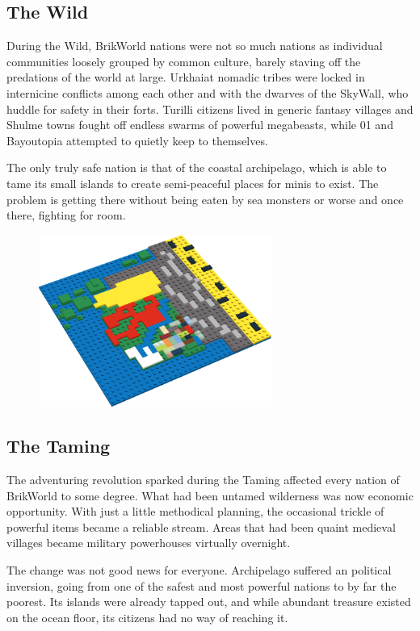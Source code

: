 \documentclass[12pt,a4paper,twocolumn]{article}
\begin{document}
\subsection {The Wild}

During the Wild, BrikWorld nations were not so much nations as individual communities loosely grouped by common culture, barely staving off the predations of the world at large.  Urkhaiat nomadic tribes were locked in internicine conflicts among each other and with the dwarves of the SkyWall, who huddle for safety in their forts.  Turilli citizens lived in generic fantasy villages and Shulme towns fought off endless swarms of powerful megabeasts, while 01 and Bayoutopia attempted to quietly keep to themselves.

The only truly safe nation is that of the coastal archipelago, which is able to tame its small islands to create semi-peaceful places for minis to exist.  The problem is getting there without being eaten by sea monsters or worse and once there, fighting for room.


\begin{figure}[h]
\includegraphics[width=3in]{TamingNations.png}
\end{figure}

\subsection{The Taming}

The adventuring revolution sparked during the Taming affected every nation of BrikWorld to some degree.  What had been untamed wilderness was now economic opportunity.  With just a little methodical planning, the occasional trickle of powerful items became a reliable stream.  Areas that had been quaint medieval villages became military powerhouses virtually overnight.

The change was not good news for everyone.  Archipelago suffered an political inversion, going from one of the safest and most powerful nations to by far the poorest.  Its islands were already tapped out, and while abundant treasure existed on the ocean floor, its citizens had no way of reaching it.
\end{document}
